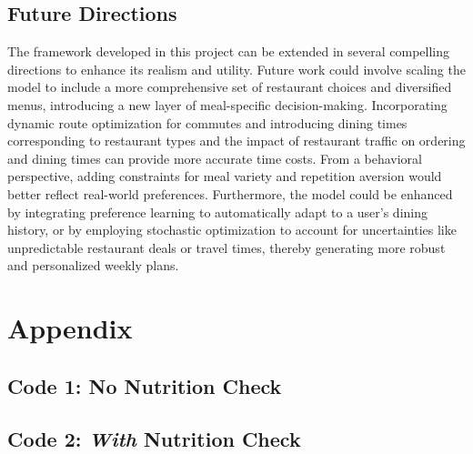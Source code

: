 \documentclass{article}
\begin{document}
\subsection{Future Directions}
The framework developed in this project can be extended in several compelling directions to enhance its realism and utility. Future work could involve scaling the model to include a more comprehensive set of restaurant choices and diversified menus, introducing a new layer of meal-specific decision-making. Incorporating dynamic route optimization for commutes and introducing dining times corresponding to restaurant types and the impact of restaurant traffic on ordering and dining times can provide more accurate time costs. From a behavioral perspective, adding constraints for meal variety and repetition aversion would better reflect real-world preferences. Furthermore, the model could be enhanced by integrating preference learning to automatically adapt to a user's dining history, or by employing stochastic optimization to account for uncertainties like unpredictable restaurant deals or travel times, thereby generating more robust and personalized weekly plans.



\newpage
% 
% 

\newpage
{}
{}
\section*{Appendix}
\label{appendix}
\subsection*{Code 1: No Nutrition Check}
\label{sec:code_1}


\newpage
\subsection*{Code 2:\textit{ With} Nutrition Check}
\label{sec:code_2}

\end{document}
